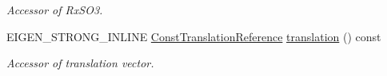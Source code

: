 \begin{DoxyCompactItemize}
\begin{DoxyCompactList}\small\item\em Accessor of Rx\+S\+O3. \end{DoxyCompactList}\item 
E\+I\+G\+E\+N\+\_\+\+S\+T\+R\+O\+N\+G\+\_\+\+I\+N\+L\+I\+NE \hyperlink{class_eigen_1_1_map_3_01const_01_sophus_1_1_sim3_group_3_01___scalar_01_4_00_01___options_01_4_a1b5c44cd51659f195655a0a20e506289}{Const\+Translation\+Reference} \hyperlink{class_eigen_1_1_map_3_01const_01_sophus_1_1_sim3_group_3_01___scalar_01_4_00_01___options_01_4_ae765cb6532155da714a0580912c3285b}{translation} () const \hypertarget{class_eigen_1_1_map_3_01const_01_sophus_1_1_sim3_group_3_01___scalar_01_4_00_01___options_01_4_ae765cb6532155da714a0580912c3285b}{}\label{class_eigen_1_1_map_3_01const_01_sophus_1_1_sim3_group_3_01___scalar_01_4_00_01___options_01_4_ae765cb6532155da714a0580912c3285b}

\begin{DoxyCompactList}\small\item\em Accessor of translation vector. \end{DoxyCompactList}\end{DoxyCompactItemize}
